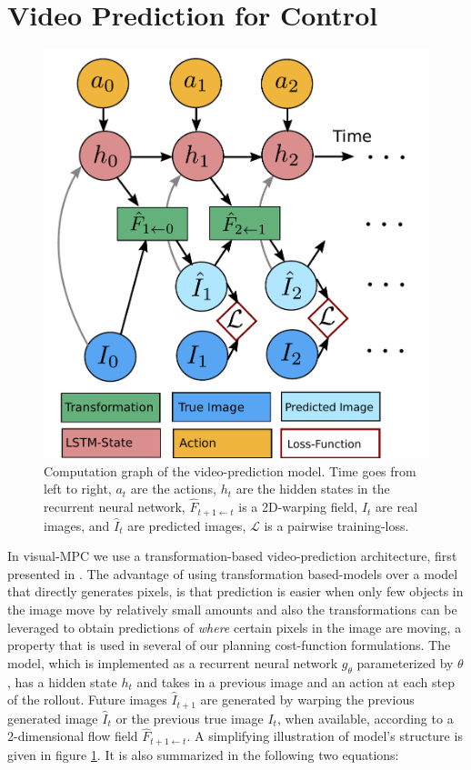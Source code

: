 \section{Video Prediction for Control}
\label{sec:model}

\begin{figure}[t]
	\centering
	\includegraphics[width=0.7\columnwidth]{images_general/prediction_model.pdf}
	\caption{\small{Computation graph of the video-prediction model. Time goes from left to right, $a_t$ are the actions, $h_t$ are the hidden states in the recurrent neural network, $\hat{F}_{t+1 \leftarrow t}$ is a 2D-warping field, $I_t$ are real images, and $\hat{I}_t$ are predicted images, $\mathcal{L}$ is a pairwise training-loss.}}   
	\label{fig:prediction_model}
\end{figure}

In visual-MPC we use a transformation-based video-prediction architecture, first presented in \cite{finn_nips}. The advantage of using transformation based-models over a model that directly generates pixels, is that prediction is easier when only few objects in the image move by relatively small amounts and also the transformations can be leveraged to obtain predictions of \emph{where} certain pixels in the image are moving, a property that is used in several of our planning cost-function formulations. The model, which is implemented as a recurrent neural network $g_{\theta}$ parameterized by $\theta$, has a hidden state $h_t$ and takes in a previous image and an action at each step of the rollout. Future images $\hat{I}_{t+1}$ are generated by warping the previous generated image $\hat{I}_t$ or the previous true image $I_t$, when available, according to a 2-dimensional flow field $\hat{F}_{t+1 \leftarrow t}$. A simplifying illustration of model's structure is given in figure \ref{fig:prediction_model}. It is also summarized in the following two equations:

